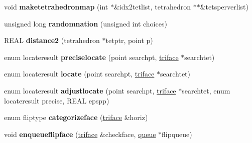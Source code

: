 \begin{DoxyCompactItemize}
void {\bfseries maketetrahedronmap} (int $\ast$\&idx2tetlist, tetrahedron $\ast$$\ast$\&tetsperverlist)
\item 
\mbox{\label{classStemMesh3D_1_1tetgenmesh_af7f2d29c73fab66fe70f571f2523cda9}} 
unsigned long {\bfseries randomnation} (unsigned int choices)
\item 
\mbox{\label{classStemMesh3D_1_1tetgenmesh_ac4f8293ddcf79f2f9ad6d0e78c7f1a0d}} 
R\+E\+AL {\bfseries distance2} (tetrahedron $\ast$tetptr, point p)
\item 
\mbox{\label{classStemMesh3D_1_1tetgenmesh_ae5eabdc306965d989b3ba70abc70b206}} 
enum locateresult {\bfseries preciselocate} (point searchpt, \hyperlink{classStemMesh3D_1_1tetgenmesh_1_1triface}{triface} $\ast$searchtet)
\item 
\mbox{\label{classStemMesh3D_1_1tetgenmesh_abe1cb79c3c51d90f2ecab3260b836337}} 
enum locateresult {\bfseries locate} (point searchpt, \hyperlink{classStemMesh3D_1_1tetgenmesh_1_1triface}{triface} $\ast$searchtet)
\item 
\mbox{\label{classStemMesh3D_1_1tetgenmesh_a2124903f5e522c82a5bf466298cc3482}} 
enum locateresult {\bfseries adjustlocate} (point searchpt, \hyperlink{classStemMesh3D_1_1tetgenmesh_1_1triface}{triface} $\ast$searchtet, enum locateresult precise, R\+E\+AL epspp)
\item 
\mbox{\label{classStemMesh3D_1_1tetgenmesh_a024a5cb3bf0f7b9bd6729b840ae7855a}} 
enum fliptype {\bfseries categorizeface} (\hyperlink{classStemMesh3D_1_1tetgenmesh_1_1triface}{triface} \&horiz)
\item 
\mbox{\label{classStemMesh3D_1_1tetgenmesh_a065ef67cf6df7c1381a46e8304e1a54f}} 
void {\bfseries enqueueflipface} (\hyperlink{classStemMesh3D_1_1tetgenmesh_1_1triface}{triface} \&checkface, \hyperlink{classStemMesh3D_1_1tetgenmesh_1_1queue}{queue} $\ast$flipqueue)
\item 
\mbox{\label{classStemMesh3D_1_1tetgenmesh_a1104717782275fec9cbd402460a0123c}} 
$$
\end{DoxyCompactItemize}
